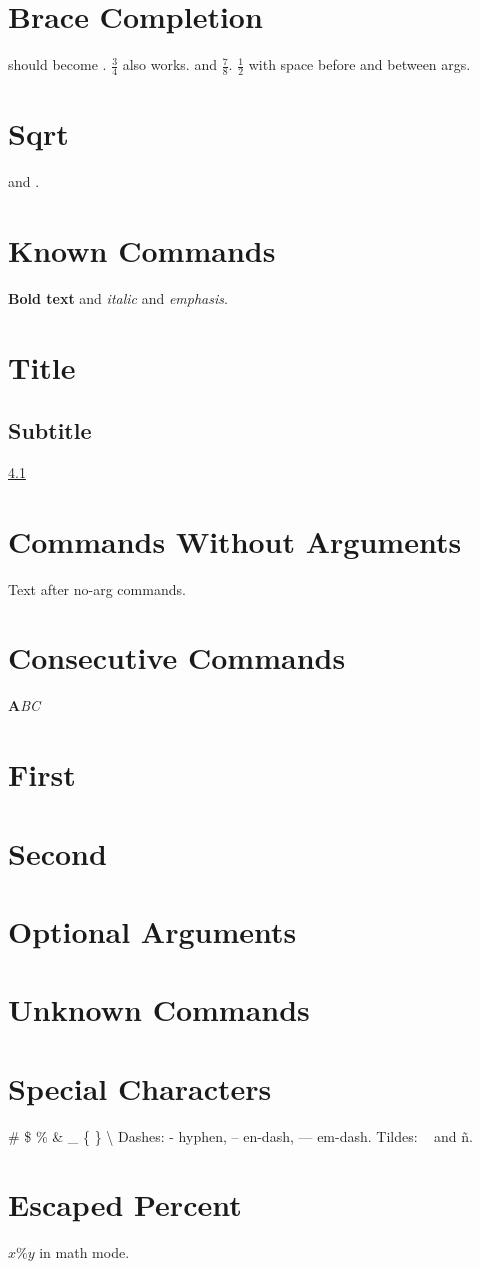 \documentclass{article}
\begin{document}
\section{Brace Completion}
 should become .
$\frac{3}{4}$ also works.
 and $\frac{7}{8}$.
$\frac{1}{2}$ with space before and between args.

\section{Sqrt}
 and .

\section{Known Commands}
\textbf{Bold text} and \textit{italic} and \emph{emphasis}.
\section{Title}
\subsection{Subtitle}
\label{sec:intro}
\ref{sec:intro}
\cite{key2024}

\section{Commands Without Arguments}
\centering
\bigskip
\noindent Text after no-arg commands.

\section{Consecutive Commands}
\textbf{A}\textit{B}\emph{C}
\section{First}\section{Second}
\label{sec:first}\label{sec:second}

\section{Optional Arguments}
\usepackage[utf8]{inputenc}

\section{Unknown Commands}
\unknown

\section{Special Characters}
\# \$ \% \& \_ \{ \} \textbackslash
Dashes: - hyphen, -- en-dash, --- em-dash.
Tildes: ~ and \~{n}.

\section{Escaped Percent}
$x \% y$ in math mode.
\end{document}

